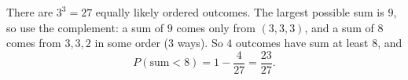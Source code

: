 There are $3^3=27$ equally likely ordered outcomes. The largest possible sum is $9$, so use the complement: a sum of $9$ comes only from $(3,3,3)$, and a sum of $8$ comes from $3,3,2$ in some order ($3$ ways). So $4$ outcomes have sum at least $8$, and
\[
P(\text{sum}<8)=1-\dfrac{4}{27}=\boxed{\dfrac{23}{27}}.
\]
